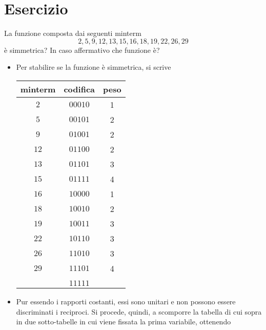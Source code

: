 \documentclass[a4paper]{extarticle}
\renewcommand\arraystretch{}
\begin{document}
\noindent
\section{Esercizio}
La funzione composta dai seguenti minterm
\[2, 5, 9, 12 ,13 ,15 ,16 ,18 ,19 ,22 ,26 ,29\]
è simmetrica? In caso affermativo che funzione è?

\begin{itemize}
    \item Per stabilire se la funzione è simmetrica, si scrive

    \noindent
    \begin{table}[H]
    \setlength{\tabcolsep}{4pt}
    \renewcommand{\arraystretch}{1.2}
    \centering
    \begin{tabular}{|c|c|c|}
        minterm & codifica & peso\\
        \hline
        $2$ & $00010$ & 1\\
        $5$ & $00101$ & 2\\
        $9$ & $01001$ & 2\\
        $12$ & $01100$ & 2\\
        $13$ & $01101$ & 3\\
        $15$ & $01111$ & 4\\
        $16$ & $10000$ & 1\\
        $18$ & $10010$ & 2\\
        $19$ & $10011$ & 3\\
        $22$ & $10110$ & 3\\
        $26$ & $11010$ & 3\\
        $29$ & $11101$ & 4\\
        \hline
         & & \\
         & $11111$ & \\
    \end{tabular}
    \end{table}

    \item Pur essendo i rapporti costanti, essi sono unitari e non possono essere discriminati i reciproci. Si procede, quindi, a scomporre la tabella di cui sopra in due sotto-tabelle in cui viene fissata la prima variabile, ottenendo
    

\end{itemize}
\end{document}
